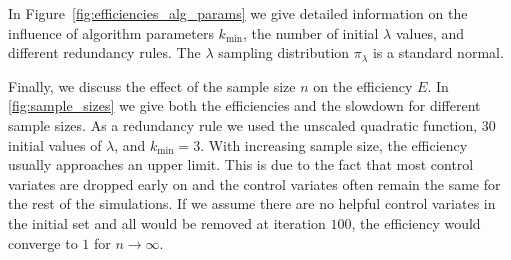 In Figure~\ref{fig:efficiencies_alg_params} we give detailed information on the influence of
algorithm parameters $k_{\min}$, the number of initial $\lambda$ values, and
different redundancy rules.
The $\lambda$ sampling distribution $\pi_{\lambda}$ is a standard normal.

Finally, we discuss the effect of the sample size $n$ on the efficiency $E$. In \autoref{fig:sample_sizes}
we give both the efficiencies and the slowdown for different sample sizes.
As a redundancy rule we used the unscaled quadratic function, $30$ initial values of $\lambda$,
and $k_{\min}=3$. With increasing sample size, the efficiency usually approaches an upper limit.
This is due to the fact that most control  variates are dropped early on and
the control  variates often remain the same for the rest of the simulations.
If we assume there are no helpful control  variates in the initial set
and all would be removed at iteration $100$, the efficiency would converge to $1$
for $n\to \infty$.
